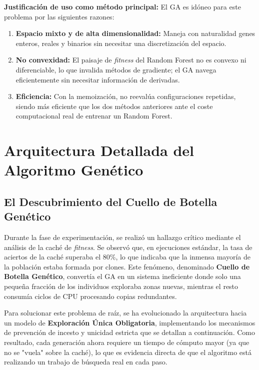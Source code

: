 \documentclass[12pt, a4paper]{article}
\begin{document}
\textbf{Justificación de uso como método principal:} El GA es idóneo para este problema
por las siguientes razones:
\begin{enumerate}[itemsep=0.2em]
  \item \textbf{Espacio mixto y de alta dimensionalidad:} Maneja con naturalidad genes
        enteros, reales y binarios sin necesitar una discretización del espacio.
  \item \textbf{No convexidad:} El paisaje de \textit{fitness} del Random Forest no es
        convexo ni diferenciable, lo que invalida métodos de gradiente; el GA navega
        eficientemente sin necesitar información de derivadas.
  \item \textbf{Eficiencia:} Con la memoización, no reevalúa configuraciones repetidas,
        siendo más eficiente que los dos métodos anteriores ante el coste computacional
        real de entrenar un Random Forest.
\end{enumerate}

\section{Arquitectura Detallada del Algoritmo Genético}

\subsection{El Descubrimiento del Cuello de Botella Genético}

Durante la fase de experimentación, se realizó un hallazgo crítico mediante el análisis de la
caché de \textit{fitness}. Se observó que, en ejecuciones estándar, la tasa de aciertos de
la caché superaba el 80\%, lo que indicaba que la inmensa mayoría de la población estaba
formada por clones. Este fenómeno, denominado \textbf{Cuello de Botella Genético}, convertía
el GA en un sistema ineficiente donde solo una pequeña fracción de los individuos exploraba
zonas nuevas, mientras el resto consumía ciclos de CPU procesando copias redundantes.

Para solucionar este problema de raíz, se ha evolucionado la arquitectura hacia un modelo de
\textbf{Exploración Única Obligatoria}, implementando los mecanismos de prevención de incesto
y unicidad estricta que se detallan a continuación. Como resultado, cada generación ahora requiere
un tiempo de cómputo mayor (ya que no se "vuela" sobre la caché), lo que es evidencia directa
de que el algoritmo está realizando un trabajo de búsqueda real en cada paso.
\end{document}
